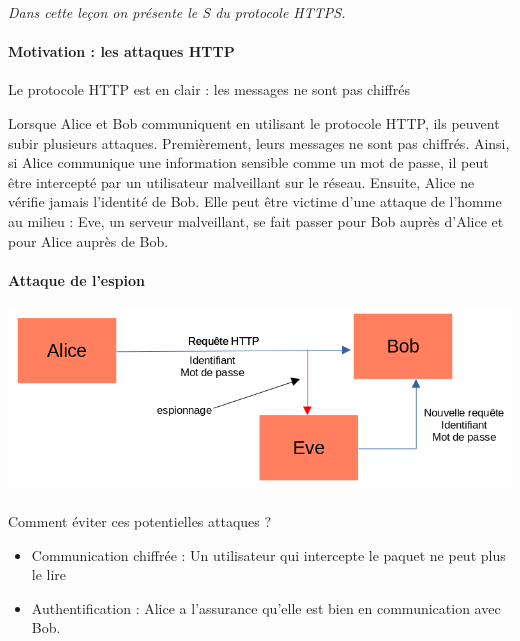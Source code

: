 
\textit{Dans cette leçon on présente le S du protocole HTTPS.}

\paragraph{Motivation : les attaques HTTP \\}
	Le protocole HTTP est en clair : les messages ne sont pas chiffrés
\begin{com}
	Lorsque Alice et Bob communiquent en utilisant le protocole HTTP, ils peuvent subir plusieurs attaques. Premièrement, leurs messages ne sont pas chiffrés. Ainsi, si Alice communique une information sensible comme un mot de passe, il peut être intercepté par un utilisateur malveillant sur le réseau. Ensuite, Alice ne vérifie jamais l'identité de Bob. Elle peut être victime d'une attaque de l'homme au milieu : Eve, un serveur malveillant, se fait passer pour Bob auprès d'Alice et pour Alice auprès de Bob.
\end{com}

	
	\paragraph{Attaque de l'espion}
	\begin{center}
		\includegraphics[scale=0.58]{Developpements/protocole https/attaque espion.png}
	\end{center}


\paragraph{}
	Comment éviter ces potentielles attaques ? 
	\begin{itemize}
		\item Communication chiffrée : Un utilisateur qui intercepte le paquet ne peut plus le lire
		\item Authentification : Alice a l'assurance qu'elle est bien en communication avec Bob.
	\end{itemize}

